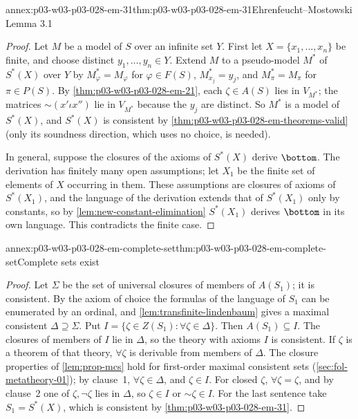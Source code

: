 \begin{annexitem}{annex:p03-w03-p03-028-em-31}{thm:p03-w03-p03-028-em-31}{Ehrenfeucht--Mostowski Lemma 3.1}
\begin{proof}
Let \(M\) be a model of \(S\) over an infinite set \(Y\).  First let
\(X=\{x_1,\ldots,x_n\}\) be finite, and choose distinct \(y_1,\ldots,y_n\in Y\).
Extend \(M\) to a pseudo-model \(M^*\) of \(S^*(X)\) over \(Y\) by
\(M^*_\varphi=M_\varphi\) for \(\varphi\in F(S)\), \(M^*_{x_j}=y_j\), and
\(M^*_\pi=M_\pi\) for \(\pi\in P(S)\).  By
\cref{thm:p03-w03-p03-028-em-21}, each \(\zeta\in A(S)\) lies in \(V_{M^*}\);
the matrices \(\mathord\sim(x'\iota x'')\) lie in \(V_{M^*}\) because the
\(y_j\) are distinct.  So \(M^*\) is a model of \(S^*(X)\), and \(S^*(X)\) is
consistent by \cref{thm:p03-w03-p03-028-em-theorems-valid} (only its
soundness direction, which uses no choice, is needed).

In general, suppose the closures of the axioms of \(S^*(X)\) derive
\(\bottom\).  The derivation has finitely many open assumptions; let \(X_1\) be
the finite set of elements of \(X\) occurring in them.  These assumptions are
closures of axioms of \(S^*(X_1)\), and the language of the derivation extends
that of \(S^*(X_1)\) only by constants, so by
\cref{lem:new-constant-elimination} \(S^*(X_1)\) derives \(\bottom\) in
its own language.  This contradicts the finite case.
\end{proof}
\end{annexitem}

\begin{annexitem}{annex:p03-w03-p03-028-em-complete-set}{thm:p03-w03-p03-028-em-complete-set}{Complete sets exist}
\begin{proof}
Let \(\Sigma\) be the set of universal closures of members of \(A(S_1)\); it is
consistent.  By the axiom of choice the formulas of the language of \(S_1\)
can be enumerated by an ordinal, and \cref{lem:transfinite-lindenbaum}
gives a maximal consistent \(\Delta\supseteq\Sigma\).  Put
\(I=\{\zeta\in Z(S_1):\forall\zeta\in\Delta\}\).  Then \(A(S_1)\subseteq I\).
The closures of members of \(I\) lie in \(\Delta\), so the theory with axioms
\(I\) is consistent.  If \(\zeta\) is a theorem of that theory, \(\forall\zeta\)
is derivable from members of \(\Delta\).  The closure properties of
\cref{lem:prop-mcs} hold for first-order maximal consistent sets
(\cref{sec:fol-metatheory-01}); by clause~1, \(\forall\zeta\in\Delta\), and
\(\zeta\in I\).  For closed \(\zeta\), \(\forall\zeta=\zeta\), and by clause~2
one of \(\zeta,\neg\zeta\) lies in \(\Delta\), so \(\zeta\in I\) or \(\mathord\sim\zeta\in I\).  For the last
sentence take \(S_1=S^*(X)\), which is consistent by
\cref{thm:p03-w03-p03-028-em-31}.
\end{proof}
\end{annexitem}

